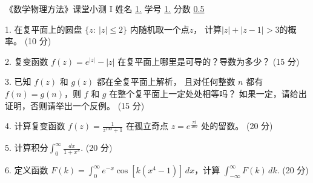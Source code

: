 \documentclass[12pt,CJK]{article}
\def\mark#1{{\color{blue} (#1 分)}}
\begin{document}
\bch

 《数学物理方法》课堂小测 I \hspace{0.2in}  姓名 \uline{1.}  学号 \uline{1.}  分数 \uline{0.5}


\bitem
\item[1. ]{ 在复平面上的圆盘 $\{z:\ |z|\le 2\}$ 内随机取一个点$z$， 计算$|z|+|z-1|>3$的概率。\mark{10} {\vskip 3in} }  
\item[2. ]{ 复变函数 $f(z) = e^{|z|}-|z|$ 在复平面上哪里是可导的？导数为多少？\mark{15} {\vskip 3in}}  
\item[3. ]{已知 $f(z)$ 和 $g(z)$ 都在全复平面上解析， 且对任何整数 $n$ 都有 $f(n)=g(n)$，则 $f$ 和 $g$ 在整个复平面上一定处处相等吗？ 如果一定，请给出证明，否则请举出一个反例。\mark{15} {\vskip 2.9in}}
\item[4. ]{计算复变函数 $f(z) = \frac{1}{z^{100}+1}$ 在孤立奇点 $z=e^{\frac{\pi\ii}{100}}$ 处的留数。\mark{20} {\vskip 3in}}         
\item[5. ]{计算积分$\int_0^\infty \frac{dx}{1+x^\pi}$. \mark{20}{\vskip 3in}}
\item[6. ]{定义函数 $F(k) = \int_0^\infty e^{-x}\cos{\left[k(x^4-1)\right]}\, dx$，计算 $\int_{-\infty}^\infty F(k)\,dk$. \mark{20} {\vskip 2.8in}}           
\eitem    


\ech
\end{document}
